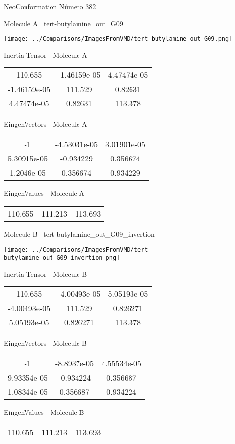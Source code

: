 \vtab[-3cm]
\begin{center}
{\large NeoConformation \tab Número 382}
\end{center}
\begin{multicols}{2}
\begin{center}

Molecule A \
tert-butylamine\_out\_G09

\texttt{[image: ../Comparisons/ImagesFromVMD/tert-butylamine\_out\_G09.png]}

Inertia Tensor - Molecule A \\
\begin{tabular}{|c c c|}
110.655	 & 	-1.46159e-05	 & 	4.47474e-05	 \\
-1.46159e-05	 & 	111.529	 & 	0.82631	 \\
4.47474e-05	 & 	0.82631	 & 	113.378
\end{tabular}

\vtab
 EingenVectors - Molecule A     \\
\begin{tabular}{|c c c|}
-1	 & 	-4.53031e-05	 & 	3.01901e-05	 \\
5.30915e-05	 & 	-0.934229	 & 	0.356674	 \\
1.2046e-05	 & 	0.356674	 & 	0.934229
\end{tabular}

\vtab
 EingenValues - Molecule A     \\
\begin{tabular}{|c c c|}
110.655	 & 	111.213	 & 	113.693	 \\
\end{tabular}
\columnbreak

Molecule B \
tert-butylamine\_out\_G09\_invertion

\texttt{[image: ../Comparisons/ImagesFromVMD/tert-butylamine\_out\_G09\_invertion.png]}

Inertia Tensor - Molecule B \\
\begin{tabular}{|c c c|}
110.655	 & 	-4.00493e-05	 & 	5.05193e-05	 \\
-4.00493e-05	 & 	111.529	 & 	0.826271	 \\
5.05193e-05	 & 	0.826271	 & 	113.378
\end{tabular}

\vtab
 EingenVectors - Molecule B     \\
\begin{tabular}{|c c c|}
-1	 & 	-8.8937e-05	 & 	4.55534e-05	 \\
9.93354e-05	 & 	-0.934224	 & 	0.356687	 \\
1.08344e-05	 & 	0.356687	 & 	0.934224
\end{tabular}

\vtab
 EingenValues - Molecule B     \\
\begin{tabular}{|c c c|}
110.655	 & 	111.213	 & 	113.693	 \\
\end{tabular}

\end{center}
\end{multicols}

